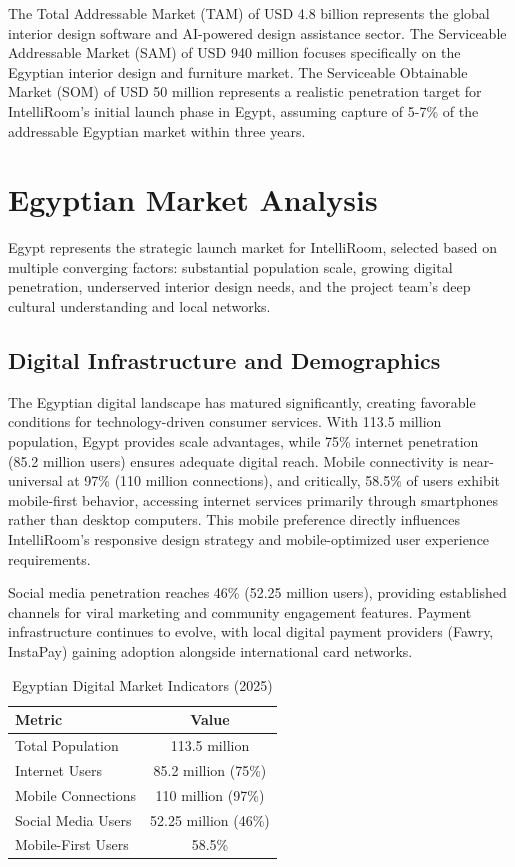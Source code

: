 The Total Addressable Market (TAM) of USD 4.8 billion represents the global interior design software and AI-powered design assistance sector. The Serviceable Addressable Market (SAM) of USD 940 million focuses specifically on the Egyptian interior design and furniture market. The Serviceable Obtainable Market (SOM) of USD 50 million represents a realistic penetration target for IntelliRoom's initial launch phase in Egypt, assuming capture of 5-7\% of the addressable Egyptian market within three years.

\section{Egyptian Market Analysis}
\label{sec:app_egypt_market}

Egypt represents the strategic launch market for IntelliRoom, selected based on multiple converging factors: substantial population scale, growing digital penetration, underserved interior design needs, and the project team's deep cultural understanding and local networks.

\subsection{Digital Infrastructure and Demographics}

The Egyptian digital landscape has matured significantly, creating favorable conditions for technology-driven consumer services. With 113.5 million population, Egypt provides scale advantages, while 75\% internet penetration (85.2 million users) ensures adequate digital reach. Mobile connectivity is near-universal at 97\% (110 million connections), and critically, 58.5\% of users exhibit mobile-first behavior, accessing internet services primarily through smartphones rather than desktop computers. This mobile preference directly influences IntelliRoom's responsive design strategy and mobile-optimized user experience requirements.

Social media penetration reaches 46\% (52.25 million users), providing established channels for viral marketing and community engagement features. Payment infrastructure continues to evolve, with local digital payment providers (Fawry, InstaPay) gaining adoption alongside international card networks.

\begin{table}[htbp]
\centering
\caption{Egyptian Digital Market Indicators (2025)}
\label{tab:egypt_demographics}
\begin{tabular}{lc}
\toprule
\textbf{Metric} & \textbf{Value} \\
\midrule
Total Population & 113.5 million \\
Internet Users & 85.2 million (75\%) \\
Mobile Connections & 110 million (97\%) \\
Social Media Users & 52.25 million (46\%) \\
Mobile-First Users & 58.5\% \\
\bottomrule
\end{tabular}
\end{table}

